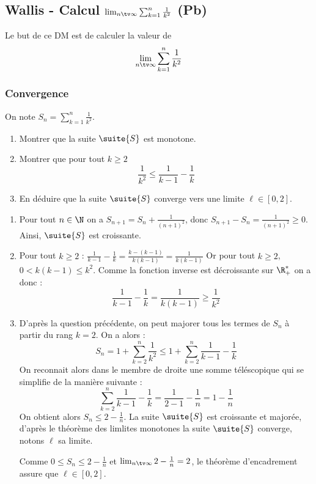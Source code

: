 \subsection{Wallis  - Calcul $\lim_{n\tv \infty} \sum_{k=1}^n \frac{1}{k^2}$ (Pb)}


Le but de ce DM est de calculer la valeur de 
$$\lim_{n\tv \infty} \sum_{k=1}^n \frac{1}{k^2}$$

\subsubsection{Convergence}
On note $S_n=  \sum_{k=1}^n \frac{1}{k^2}$.

\begin{enumerate}
\item Montrer que la suite $\suite{S}$  est monotone. 
\item Montrer que pour tout $k\geq 2$
$$\frac{1}{k^2} \leq \frac{1}{k-1}-\frac{1}{k}$$
\item En déduire que la suite $\suite{S}$ converge vers une limite $\ell \in [0,2]$. 
\end{enumerate}

\begin{correction}
\begin{enumerate}
\item Pour tout $n\in \N$ on a  $S_{n+1} = S_n + \frac{1}{(n+1)^2}$, donc 
$S_{n+1}-S_n = \frac{1}{(n+1)^2}\geq 0$. Ainsi, $\suite{S}$ est croissante. 
\item Pour tout $k\geq 2$ : $\frac{1}{k-1}-\frac{1}{k}= \frac{k-(k-1)}{k(k-1)}= \frac{1}{k(k-1)}$
Or pour tout $k\geq 2$,  $0<k(k-1) \leq k^2$. Comme la fonction inverse est décroissante sur $\R_+^*$ on a donc : 
$$\frac{1}{k-1}-\frac{1}{k}=\frac{1}{k(k-1)}\geq \frac{1}{k^2}$$

\item  D'après la question précédente, on peut majorer tous les termes de $S_n$ à partir du rang $k=2$. On  a alors : 
$$S_n = 1+ \sum_{k=2}^n\frac{1}{k^2} \leq 1 + \sum_{k=2}^n\frac{1}{k-1} -\frac{1}{k}$$
On reconnait alors dans le  membre de droite une somme téléscopique qui se simplifie de la manière suivante : 
$$\sum_{k=2}^n\frac{1}{k-1} -\frac{1}{k} = \frac{1}{2-1} -\frac{1}{n} = 1-\frac{1}{n}$$
On obtient alors $S_n  \leq 2-\frac{1}{n}$. 
La suite $\suite{S}$ est croissante et majorée, d'après le théorème des limlites monotones la suite $\suite{S}$ converge, notons $\ell$ sa limite. 

Comme $0\leq S_n\leq 2-\frac{1}{n}$ et $\lim_{n\tv \infty} 2-\frac{1}{n}=2$, le théorème d'encadrement assure que $\ell\in [0,2]$. 
 


\end{enumerate}
\end{correction}
